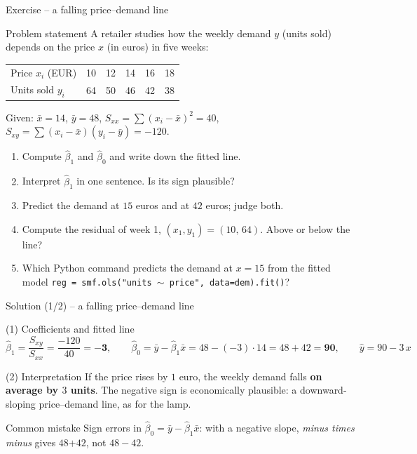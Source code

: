 \documentclass[aspectratio=169,11pt]{beamer}
\begin{document}
\begin{frame}{Exercise -- a falling price--demand line}
  \small
  \begin{block}{Problem statement}
    A retailer studies how the weekly demand $y$ (units sold) depends on the
    price $x$ (in euros) in five weeks:
    \begin{center}
      \renewcommand{\arraystretch}{1.05}
      \begin{tabular}{lccccc}
        \toprule
        Price $x_i$ (EUR) & 10 & 12 & 14 & 16 & 18\\
        Units sold $y_i$ & 64 & 50 & 46 & 42 & 38\\
        \bottomrule
      \end{tabular}
    \end{center}
    \vspace{-4pt}
    Given: $\bar x=14$, $\bar y=48$, $S_{xx}=\sum(x_i-\bar x)^2=40$,
    $S_{xy}=\sum(x_i-\bar x)(y_i-\bar y)=-120$.
    \begin{enumerate}\setlength{\itemsep}{0pt}
      \item Compute $\hat\beta_1$ and $\hat\beta_0$ and write down the fitted line.
      \item Interpret $\hat\beta_1$ in one sentence. Is its sign plausible?
      \item Predict the demand at $15$ euros and at $42$ euros; judge both.
      \item Compute the residual of week 1, $(x_1,y_1)=(10,\,64)$. Above or
            below the line?
      \item Which Python command predicts the demand at $x=15$ from the fitted
            model \texttt{reg = smf.ols("units $\sim$ price", data=dem).fit()}?
    \end{enumerate}
  \end{block}
\end{frame}

\begin{frame}{Solution (1/2) -- a falling price--demand line}
  \begin{exampleblock}{(1) Coefficients and fitted line}
    \[
      \hat\beta_1=\frac{S_{xy}}{S_{xx}}=\frac{-120}{40}=\mathbf{-3},\qquad
      \hat\beta_0=\bar y-\hat\beta_1\bar x=48-(-3)\cdot14=48+42=\mathbf{90},
      \qquad \hat y=90-3\,x
    \]
  \end{exampleblock}
  \begin{exampleblock}{(2) Interpretation}
    If the price rises by $1$ euro, the weekly demand falls \textbf{on average
    by $3$ units}. The negative sign is economically plausible: a
    downward-sloping price--demand line, as for the lamp.
  \end{exampleblock}
  \begin{alertblock}{Common mistake}
    Sign errors in $\hat\beta_0=\bar y-\hat\beta_1\bar x$: with a negative
    slope, \emph{minus times minus} gives $48\mathbf{+}42$, not $48-42$.
  \end{alertblock}
\end{frame}
\end{document}
